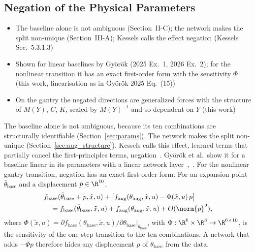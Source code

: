 \subsection{Negation of the Physical Parameters}\label{sec:obc_negation}
\ifdraft
\begin{itemize}
\item The baseline alone is not ambiguous (Section~II-C); the network makes the split non-unique (Section~III-A); Kessels calls the effect negation (Kessels Sec.~5.3.1.3)
\item Shown for linear baselines by Gy\"or\"ok (2025 Ex.~1, 2026 Ex.~2); for the nonlinear transition it has an exact first-order form with the sensitivity $\Phi$ (this work, linearisation as in Gy\"or\"ok 2025 Eq.~(15))
\item On the gantry the negated directions are generalized forces with the structure of $M(Y)$, $C$, $K$, scaled by $M(Y)^{-1}$ and so dependent on $Y$ (this work)
\end{itemize}
\fi

The baseline alone is not ambiguous, because its ten combinations are
structurally identifiable (Section~\ref{sec:params}).
The network makes the split non-unique (Section~\ref{sec:aug_structure}).
Kessels calls this effect, learned terms that partially cancel the
first-principles terms, negation~\cite[Sec.~5.3.1.3]{kessels2025ai}.
Gy\"or\"ok et al.\ show it for a baseline linear in its parameters with a
linear network layer~\cite[Ex.~1]{gyorok2025l4dc},~\cite[Ex.~2]{gyorok2026obc}.
For the nonlinear gantry transition, negation has an exact first-order form.
For an expansion point $\bar\theta_{\mathrm{base}}$ and a displacement
$p\in\R^{10}$,
\begin{equation}
\begin{aligned}
 &f_{\mathrm{base}}(\bar\theta_{\mathrm{base}}+p,\tilde x,u)
 +\bigl[f_{\mathrm{aug}}(\theta_{\mathrm{aug}},\hat x,u)-\Phi(\tilde x,u)\,p\bigr]\\
 &\quad=f_{\mathrm{base}}(\bar\theta_{\mathrm{base}},\tilde x,u)
 +f_{\mathrm{aug}}(\theta_{\mathrm{aug}},\hat x,u)+O(\norm{p}^2),
\end{aligned}
\label{eq:obc_negation}
\end{equation}
where
$\Phi(\tilde x,u)=\partial f_{\mathrm{base}}(\theta_{\mathrm{base}},\tilde x,u)/\partial\theta_{\mathrm{base}}
|_{\bar\theta_{\mathrm{base}}}$, with $\Phi:\R^6\times\R^3\to\R^{6\times10}$,
is the sensitivity of the one-step transition to the ten combinations.
A network that adds $-\Phi p$ therefore hides any displacement $p$ of
$\theta_{\mathrm{base}}$ from the data.

